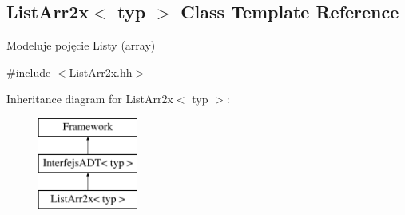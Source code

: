 \hypertarget{class_list_arr2x}{\subsection{List\-Arr2x$<$ typ $>$ Class Template Reference}
\label{class_list_arr2x}
}


Modeluje pojęcie Listy (array)  




{\ttfamily \#include $<$List\-Arr2x.\-hh$>$}

Inheritance diagram for List\-Arr2x$<$ typ $>$\-:\begin{figure}[H]
\begin{center}
\leavevmode
\includegraphics[height=3.000000cm]{class_list_arr2x}
\end{center}
\end{figure}
